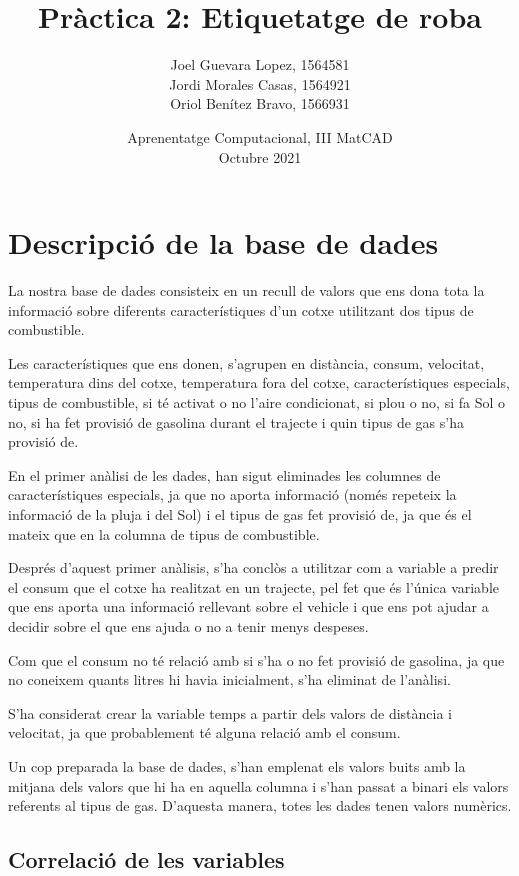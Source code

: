 \documentclass[a4paper, 11pt]{article}
\title{\Huge{\textbf{Pràctica 2: Etiquetatge de roba}}}
\author{\Large{Joel Guevara Lopez, 1564581}
        \\\Large{Jordi Morales Casas, 1564921}
        \\\Large{Oriol Benítez Bravo, 1566931}}
\date{Aprenentatge Computacional, III MatCAD\\ \vspace{6pt} Octubre 2021}
\begin{document}
    \maketitle

    \section{Descripció de la base de dades}

    La nostra base de dades consisteix en un recull de valors que ens dona tota la informació sobre
    diferents característiques d'un cotxe utilitzant dos tipus de combustible.

    Les característiques que ens donen, s'agrupen en distància, consum, velocitat, temperatura dins
    del cotxe, temperatura fora del cotxe, característiques especials, tipus de combustible, si té
    activat o no l'aire condicionat, si plou o no, si fa Sol o no, si ha fet provisió de gasolina
    durant el trajecte i quin tipus de gas s'ha provisió de.

    En el primer anàlisi de les dades, han sigut eliminades les columnes de característiques
    especials, ja que no aporta informació (només repeteix la informació de la pluja i del Sol) i el
     tipus de gas fet provisió de, ja que és el mateix que en la columna de tipus de combustible.

    Després d'aquest primer anàlisis, s'ha conclòs a utilitzar com a variable a predir el consum que
     el cotxe ha realitzat en un trajecte, pel fet que és l'única variable que ens aporta una
     informació rellevant sobre el vehicle i que ens pot ajudar a decidir sobre el que ens ajuda o
     no a tenir menys despeses.

    Com que el consum no té relació amb si s'ha o no fet provisió de gasolina, ja que no coneixem
    quants litres hi havia inicialment, s'ha eliminat de l'anàlisi.

    S'ha considerat crear la variable temps a partir dels valors de distància i velocitat, ja que
    probablement té alguna relació amb el consum.

    Un cop preparada la base de dades, s'han emplenat els valors buits amb la mitjana dels valors
    que hi ha en aquella columna i s'han passat a binari els valors referents al tipus de gas.
    D'aquesta manera, totes les dades tenen valors numèrics.

    \subsection{Correlació de les variables}
\end{document}
